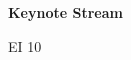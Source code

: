 \documentclass[a4paper]{article}
\begin{document}
\printGenericVSLHeader
\begin{center}
\begin{vsltext}{3cm}{3.5cm}

    \vspace{0.5cm}

    \textbf{Keynote Stream} 
    
    \vspace{1.5cm}

    EI 10

\end{vsltext}

\end{center}
\end{document}
